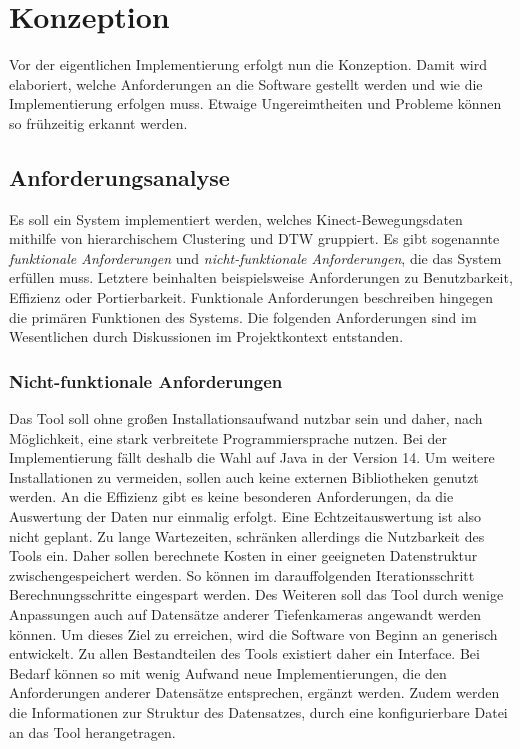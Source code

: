 \chapter{Konzeption}
\label{chapter4}
Vor der eigentlichen Implementierung erfolgt nun die Konzeption.
Damit wird elaboriert, welche Anforderungen an die Software gestellt werden
und wie die Implementierung erfolgen muss.
Etwaige Ungereimtheiten und Probleme können so frühzeitig erkannt werden.

\section{Anforderungsanalyse}
\label{4-Anforderungsanalyse}
Es soll ein System implementiert werden,
welches Kinect-Bewegungsdaten mithilfe von hierarchischem Clustering und \ac{DTW} gruppiert.
Es gibt sogenannte \emph{funktionale Anforderungen} und \emph{nicht-funktionale Anforderungen},
die das System erfüllen muss.
Letztere beinhalten beispielsweise Anforderungen zu Benutzbarkeit, Effizienz oder Portierbarkeit.
Funktionale Anforderungen beschreiben hingegen die primären Funktionen des Systems.
Die folgenden Anforderungen sind im Wesentlichen durch Diskussionen im Projektkontext entstanden.

\subsection{Nicht-funktionale Anforderungen}
\label{4-NichtFunktionaleAnforderungen}
Das Tool soll ohne großen Installationsaufwand nutzbar sein
und daher, nach Möglichkeit, eine stark verbreitete Programmiersprache nutzen.
Bei der Implementierung fällt deshalb die Wahl auf Java in der Version 14.
Um weitere Installationen zu vermeiden, sollen auch keine externen Bibliotheken genutzt werden.
An die Effizienz gibt es keine besonderen Anforderungen,
da die Auswertung der Daten nur einmalig erfolgt.
Eine Echtzeitauswertung ist also nicht geplant.
Zu lange Wartezeiten, schränken allerdings die Nutzbarkeit des Tools ein.
Daher sollen berechnete Kosten in einer geeigneten Datenstruktur zwischengespeichert werden.
So können im darauffolgenden Iterationsschritt Berechnungsschritte eingespart werden.
Des Weiteren soll das Tool durch wenige Anpassungen auch auf Datensätze anderer Tiefenkameras angewandt werden können.
Um dieses Ziel zu erreichen, wird die Software von Beginn an generisch entwickelt.
Zu allen Bestandteilen des Tools existiert daher ein Interface.
Bei Bedarf können so mit wenig Aufwand neue Implementierungen,
die den Anforderungen anderer Datensätze entsprechen, ergänzt werden.
Zudem werden die Informationen zur Struktur des Datensatzes,
durch eine konfigurierbare Datei an das Tool herangetragen.

